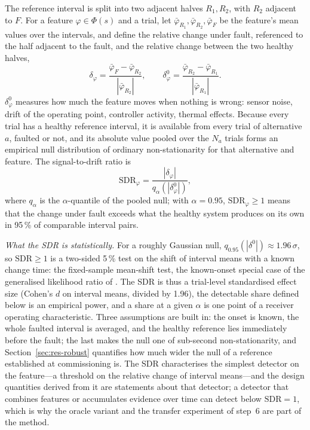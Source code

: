 The reference interval is split into two adjacent halves $R_1, R_2$, with $R_2$ adjacent to $F$. For a feature $\varphi\in\Phi(s)$ and a trial, let $\bar\varphi_{R_1}, \bar\varphi_{R_2}, \bar\varphi_F$ be the feature's mean values over the intervals, and define the relative change under fault, referenced to the half adjacent to the fault, and the relative change between the two healthy halves,
\begin{equation}
  \delta_\varphi = \frac{\bar\varphi_F - \bar\varphi_{R_2}}{|\bar\varphi_{R_2}|}, \qquad
  \delta^0_\varphi = \frac{\bar\varphi_{R_2} - \bar\varphi_{R_1}}{|\bar\varphi_{R_1}|}.
  \label{eq:delta}
\end{equation}
$\delta^0_\varphi$ measures how much the feature moves when nothing is wrong: sensor noise, drift of the operating point, controller activity, thermal effects. Because every trial has a healthy reference interval, it is available from every trial of alternative $a$, faulted or not, and its absolute value pooled over the $N_a$ trials forms an empirical null distribution of ordinary non-stationarity for that alternative and feature. The signal-to-drift ratio is
\begin{equation}
  \mathrm{SDR}_\varphi = \frac{|\delta_\varphi|}{q_\alpha\!\left(|\delta^0_\varphi|\right)},
  \label{eq:sdr}
\end{equation}
where $q_\alpha$ is the $\alpha$-quantile of the pooled null; with $\alpha=0.95$, $\mathrm{SDR}_\varphi\ge1$ means that the change under fault exceeds what the healthy system produces on its own in 95\,\% of comparable interval pairs.

\emph{What the SDR is statistically.} For a roughly Gaussian null, $q_{0.95}(|\delta^0|)\approx1.96\,\sigma$, so $\mathrm{SDR}\ge1$ is a two-sided 5\,\% test on the shift of interval means with a known change time: the fixed-sample mean-shift test, the known-onset special case of the generalised likelihood ratio of \citet{Basseville1993}. The SDR is thus a trial-level standardised effect size (Cohen's $d$ on interval means, divided by 1.96), the detectable share defined below is an empirical power, and a share at a given $\alpha$ is one point of a receiver operating characteristic. Three assumptions are built in: the onset is known, the whole faulted interval is averaged, and the healthy reference lies immediately before the fault; the last makes the null one of sub-second non-stationarity, and Section~\ref{sec:res-robust} quantifies how much wider the null of a reference established at commissioning is. The SDR characterises the simplest detector on the feature---a threshold on the relative change of interval means---and the design quantities derived from it are statements about that detector; a detector that combines features or accumulates evidence over time can detect below $\mathrm{SDR}=1$, which is why the oracle variant and the transfer experiment of step~6 are part of the method.

